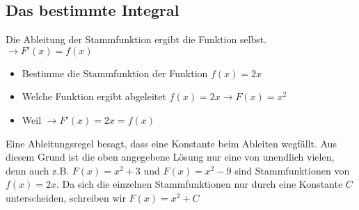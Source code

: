 \newpage
\subsection{Das bestimmte Integral}

Die Ableitung der Stammfunktion ergibt die Funktion selbst. $\rightarrow F'(x)=f(x)$

\hfill\break
\begin{itemize}
    \item Bestimme die Stammfunktion der Funktion $f(x)=2x$
    \item Welche Funktion ergibt abgeleitet $f(x)=2x \rightarrow F(x)=x^2$
    \item Weil $\rightarrow F'(x) = 2x = f(x)$
\end{itemize}

Eine Ableitungsregel besagt, dass eine Konstante beim Ableiten wegfällt.
Aus diesem Grund ist die oben angegebene Lösung nur eine von unendlich vielen, denn auch z.B. $F(x)=x^2+3$ und $F(x)=x^2-9$ sind Stammfunktionen von $f(x)=2x$.
Da sich die einzelnen Stammfunktionen nur durch eine Konstante $C$ unterscheiden, schreiben wir $F(x)=x^2+C$